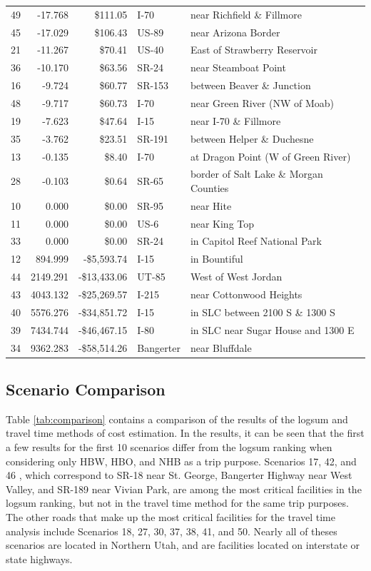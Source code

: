 \begin{table}
\begin{tabular}[t]{crrll}
49 & -17.768 & \$111.05 & I-70 & near Richfield \& Fillmore\\
45 & -17.029 & \$106.43 & US-89 & near Arizona Border\\
21 & -11.267 & \$70.41 & US-40 & East of Strawberry Reservoir\\
36 & -10.170 & \$63.56 & SR-24 & near Steamboat Point\\
16 & -9.724 & \$60.77 & SR-153 & between Beaver \& Junction\\
48 & -9.717 & \$60.73 & I-70 & near Green River (NW of Moab)\\
19 & -7.623 & \$47.64 & I-15 & near I-70 \& Fillmore\\
35 & -3.762 & \$23.51 & SR-191 & between Helper \& Duchesne\\
13 & -0.135 & \$8.40 & I-70 & at Dragon Point (W of Green River)\\
28 & -0.103 & \$0.64 & SR-65 & border of Salt Lake \& Morgan Counties\\
10 & 0.000 & \$0.00 & SR-95 & near Hite\\
11 & 0.000 & \$0.00 & US-6 & near King Top\\
33 & 0.000 & \$0.00 & SR-24 & in Capitol Reef National Park\\
12 & 894.999 & -\$5,593.74 & I-15 & in Bountiful\\
44 & 2149.291 & -\$13,433.06 & UT-85 & West of West Jordan\\
43 & 4043.132 & -\$25,269.57 & I-215 & near Cottonwood Heights\\
40 & 5576.276 & -\$34,851.72 & I-15 & in SLC between 2100 S \& 1300 S\\
39 & 7434.744 & -\$46,467.15 & I-80 & in SLC near Sugar House and 1300 E\\
34 & 9362.283 & -\$58,514.26 & Bangerter & near Bluffdale\\
\bottomrule
\end{tabular}
\end{table}


\subsection{Scenario Comparison}
Table \ref{tab:comparison} contains a comparison of the results of the logsum
and travel time methods of cost estimation. In the results, it can be seen that the first
a few results for the first 10 scenarios differ from the logsum ranking when considering
only HBW, HBO, and NHB as a trip purpose. Scenarios 17, 42, and 46 , which
correspond to SR-18 near St. George, Bangerter Highway near West Valley, and SR-189
near Vivian Park, are among the
most critical facilities in the logsum ranking, but not in the travel time method
for the same trip purposes. The other roads that make up the most critical facilities
for the travel time analysis include Scenarios 18, 27, 30, 37, 38, 41, and 50.
Nearly all of theses scenarios are located in Northern Utah, and are facilities
located on interstate or state highways.

